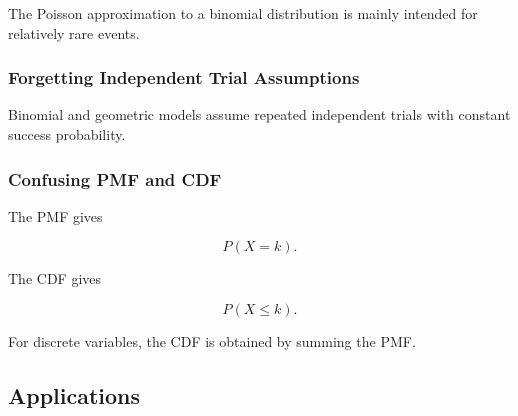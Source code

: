 The Poisson approximation to a binomial distribution is mainly intended
for relatively rare events.

\subsubsection{Forgetting Independent Trial Assumptions}

Binomial and geometric models assume repeated independent trials with
constant success probability.

\subsubsection{Confusing PMF and CDF}

The PMF gives

\[
P(X=k).
\]

The CDF gives

\[
P(X\leq k).
\]

For discrete variables, the CDF is obtained by summing the PMF.

\subsection{Applications}
\label{subsec:discrete-distributions-applications}

